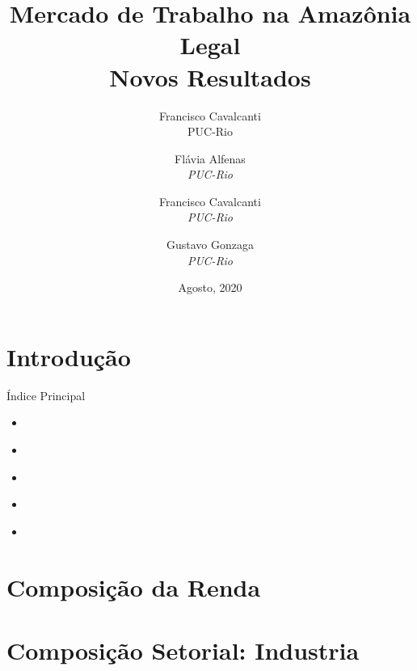 \documentclass[11pt]{beamer}
\author[Francisco Cavalcanti]{Francisco Cavalcanti\\\footnotesize{PUC-Rio}
}
\author{
Flávia  Alfenas\\
\textit{PUC-Rio}\\ \vspace{3mm}
\and  
Francisco Cavalcanti\\
\textit{PUC-Rio}\\ \vspace{3mm}
\and   
Gustavo Gonzaga \\
\textit{PUC-Rio} 
}
\date{Agosto, 2020}
\title{Mercado de Trabalho na Amazônia Legal \\ Novos Resultados}
\begin{document}

\begin{frame}
\titlepage
\end{frame}


\section{Introdução}


\begin{frame}[label=indice_principal]{Índice Principal}

\begin{itemize}
\item{
	\hyperlink{_outras_rendas_composicao}{} 
	}   
		
\item{
	\hyperlink{_retrato_emprego_sgap_industria}{}
	}  
	
\item{
    \hyperlink{_retrato_emprego_setor_sgap_trans}{}
    }  

\item{
	\hyperlink{_retrato_emprego_sgap_agricultura}{} 
	}  
	
\item{
	\hyperlink{_outros_emprego}{}
	}  

\end{itemize}

\end{frame}


\section{Composição da Renda}



\section{Composição Setorial: Industria}
\end{document}
